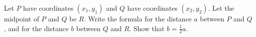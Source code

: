 \begin{frame}
\begin{example}
Let $P$ have coordinates $(x_1, y_1)$ and $Q$ have coordinates $(x_2, y_2)$. Let the midpoint of $P$ and $Q$ be $R$. Write the formula for the distance $a$ between $P$ and $Q$, and for the distance $b$ between $Q$ and $R$. Show that $b=\frac{1}{2}a$.
\end{example}


\end{frame}